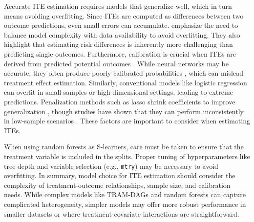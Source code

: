 Accurate ITE estimation requires models that generalize well, which in turn means avoiding overfitting. Since ITEs are computed as differences between two outcome predictions, even small errors can accumulate. \citet{hoogland2021} emphasize the need to balance model complexity with data availability to avoid overfitting. They also highlight that estimating risk differences is inherently more challenging than predicting single outcomes. Furthermore, calibration is crucial when ITEs are derived from predicted potential outcomes \citep{hoogland2024}. While neural networks may be accurate, they often produce poorly calibrated probabilities \citep{guo2017}, which can mislead treatment effect estimation. Similarly, conventional models like logistic regression can overfit in small samples or high-dimensional settings, leading to extreme predictions. Penalization methods such as lasso shrink coefficients to improve generalization \citep{riley2021}, though studies have shown that they can perform inconsistently in low-sample scenarios \citep{calster2020}. These factors are important to consider when estimating ITEs.

When using random forests as S-learners, care must be taken to ensure that the treatment variable is included in the splits. Proper tuning of hyperparameters like tree depth and variable selection (e.g., \texttt{mtry}) may be necessary to avoid overfitting.
In summary, model choice for ITE estimation should consider the complexity of treatment-outcome relationships, sample size, and calibration needs. While complex models like TRAM-DAGs and random forests can capture complicated heterogeneity, simpler models may offer more robust performance in smaller datasets or where treatment-covariate interactions are straightforward.



